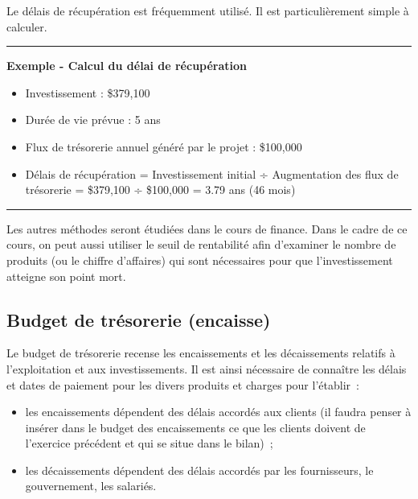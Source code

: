 \documentclass[oneside]{kaobook}
\begin{document}
Le délais de récupération est fréquemment utilisé. Il est particulièrement simple à calculer.

\noindent\rule{\textwidth}{0.5pt}
\textbf{Exemple - Calcul du délai de récupération}
\begin{itemize}
\item Investissement : \$379,100
\item Durée de vie prévue : 5  ans
\item Flux de trésorerie annuel généré par le projet : \$100,000
\item Délais de récupération = Investissement initial  ÷  Augmentation des flux de trésorerie = \$379,100 ÷ \$100,000 = 3.79 ans (46 mois)
\end{itemize}

\noindent\rule{\textwidth}{0.5pt}

Les autres méthodes seront étudiées dans le cours de finance. Dans le cadre de ce cours, on peut aussi utiliser le seuil de rentabilité afin d'examiner le nombre de produits (ou le chiffre d'affaires) qui sont nécessaires pour que l'investissement atteigne son point mort.

\subsection{Budget de trésorerie (encaisse)}
\label{sec:org1826366}
Le budget de trésorerie recense les encaissements et les décaissements relatifs à l'exploitation et aux investissements. Il est ainsi nécessaire de connaître les délais et dates de paiement pour les divers produits et charges pour l'établir :
\begin{itemize}
\item les encaissements dépendent des délais accordés aux clients (il faudra penser à insérer dans le budget des encaissements ce que les clients doivent de l'exercice précédent et qui se situe dans le bilan) ;
\item les décaissements dépendent des délais accordés par les fournisseurs, le gouvernement, les salariés.
\end{itemize}
\end{document}

